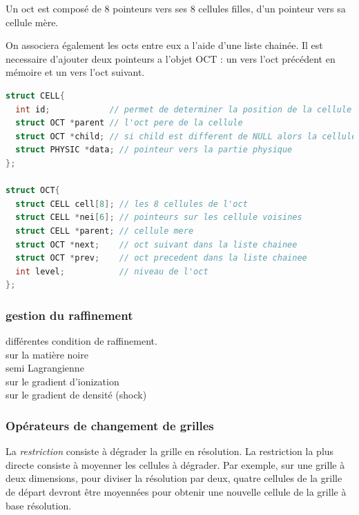 Un oct est composé de 8 pointeurs vers ses 8 cellules filles, d'un pointeur vers sa cellule mère.

On associera également les octs entre eux a l'aide d'une liste chainée. 
Il est necessaire d'ajouter deux pointeurs a l'objet OCT : un vers l'oct précédent en mémoire et un vers l'oct suivant.


\begin{lstlisting}[float=bth,language=C,frame=tb,caption={les structures CELL et OCT de EMMA},label=lst:useless]
struct CELL{
  int id;            // permet de determiner la position de la cellule dans l'oct
  struct OCT *parent // l'oct pere de la cellule
  struct OCT *child; // si child est different de NULL alors la cellule est raffiner et child point vers l'oct enfant
  struct PHYSIC *data; // pointeur vers la partie physique
};

struct OCT{
  struct CELL cell[8]; // les 8 cellules de l'oct
  struct CELL *nei[6]; // pointeurs sur les cellule voisines
  struct CELL *parent; // cellule mere
  struct OCT *next;    // oct suivant dans la liste chainee
  struct OCT *prev;    // oct precedent dans la liste chainee
  int level;           // niveau de l'oct
};
\end{lstlisting}





\subsubsection{gestion du raffinement}
différentes condition de raffinement.\\
sur la matière noire\\
semi Lagrangienne\\
sur le gradient d'ionization\\
sur le gradient de densité (shock)\\





\subsubsection{Opérateurs de changement de grilles} \label{Opérateurs de changement de grilles}

La \emph{restriction} consiste à dégrader la grille en résolution. La restriction la plus directe consiste à moyenner les cellules à dégrader. Par exemple, sur une grille à deux dimensions, pour diviser la résolution par deux, quatre cellules de la grille de départ devront être moyennées pour obtenir une nouvelle cellule de la grille à base résolution. \\

